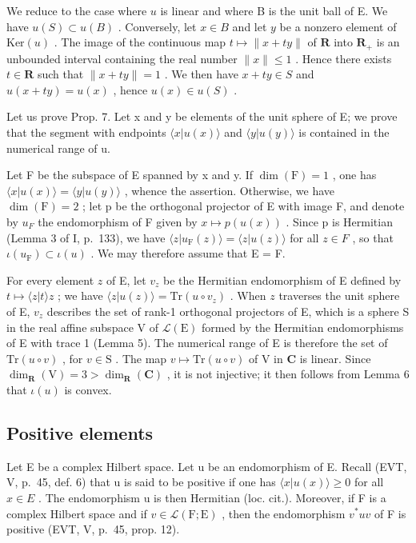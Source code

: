We reduce to the case where \(u\) is linear and where B is the unit ball of E. We have \(u(S) \subset u(B)\) . Conversely, let \(x \in B\) and let \(y\) be a nonzero element of \(\text{Ker}(u)\) . The image of the continuous map \(t \mapsto \|x + ty\|\) of \(\mathbf{R}\) into \(\mathbf{R}_+\) is an unbounded interval containing the real number \(\|x\| \leqslant 1\) . Hence there exists \(t \in \mathbf{R}\) such that \(\|x + ty\| = 1\) . We then have \(x + ty \in S\) and \(u(x + ty) = u(x)\) , hence \(u(x) \in u(S)\) .

Let us prove Prop. 7. Let x and y be elements of the unit sphere of E; we prove that the segment with endpoints \(\langle x|u(x)\rangle\) and \(\langle y|u(y)\rangle\) is contained in the numerical range of u.

Let F be the subspace of E spanned by x and y. If \(\dim(\mathrm{F}) = 1\) , one has \(\langle x|u(x)\rangle = \langle y|u(y)\rangle\) , whence the assertion. Otherwise, we have \(\dim(\mathrm{F}) = 2\) ; let p be the orthogonal projector of E with image F, and denote by \(u_{F}\) the endomorphism of F given by \(x \mapsto p(u(x))\) . Since p is Hermitian (Lemma 3 of I, p.~133), we have \(\langle z|u_{\mathrm{F}}(z)\rangle = \langle z|u(z)\rangle\) for all \(z \in F\) , so that \(\iota(u_{\mathrm{F}}) \subset \iota(u)\) . We may therefore assume that E = F.

For every element \(z\) of E, let \(v_{z}\) be the Hermitian endomorphism of E defined by \(t \mapsto \langle z|t\rangle z\) ; we have \(\langle z|u(z)\rangle = \mathrm{Tr}(u \circ v_{z})\) . When \(z\) traverses the unit sphere of E, \(v_{z}\) describes the set of rank-1 orthogonal projectors of E, which is a sphere S in the real affine subspace V of \(\mathcal{L}(\mathrm{E})\) formed by the Hermitian endomorphisms of E with trace 1 (Lemma 5). The numerical range of E is therefore the set of \(\mathrm{Tr}(u \circ v)\) , for \(v \in \mathrm{S}\) . The map \(v \mapsto \mathrm{Tr}(u \circ v)\) of V in \(\mathbf{C}\) is linear. Since \(\dim_{\mathbf{R}}(\mathrm{V}) = 3 > \dim_{\mathbf{R}}(\mathbf{C})\) , it is not injective; it then follows from Lemma 6 that \(\iota(u)\) is convex.

\subsection{Positive elements}

Let E be a complex Hilbert space. Let u be an endomorphism of E. Recall (EVT, V, p.~45, def. 6) that u is said to be positive if one has \(\langle x|u(x)\rangle\geqslant0\) for all \(x\in E\) . The endomorphism u is then Hermitian (loc. cit.). Moreover, if F is a complex Hilbert space and if \(v\in\mathcal{L}(\mathrm{F};\mathrm{E})\) , then the endomorphism \(v^{*}uv\) of F is positive (EVT, V, p.~45, prop. 12).

